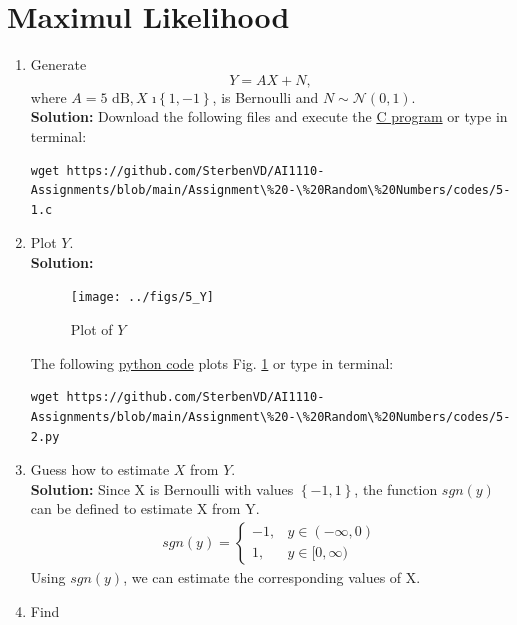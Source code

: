 \documentclass[journal,12pt,twocolumn]{IEEEtran}
\numberwithin{equation}{section}
\renewcommand\thesection{\arabic{section}}
\providecommand{\brak}[1]{\ensuremath{\left(#1\right)}}
\providecommand{\cbrak}[1]{\ensuremath{\left\{#1\right\}}}
\providecommand{\gauss}[2]{\mathcal{N}\ensuremath{\left(#1,#2\right)}}
\providecommand{\gitlink}[2]{{\color{blue}\href{https://github.com/SterbenVD/AI1110-Assignments/blob/main/Assignment\%20-\%20Random\%20Numbers/#1}{#2}}}
\newcommand{\solution}{\noindent \textbf{Solution: }}
\begin{document}
\section{Maximul Likelihood}
\begin{enumerate}[label=\thesection.\arabic*
        ,ref=\thesection.\theenumi]
    \item Generate
          \begin{equation}
              Y = AX+N,
          \end{equation}
          where $A = 5 \text{ dB}, X$ \i $\cbrak{1,-1}$,  is Bernoulli and $N \sim \gauss{0}{1}$. \\
          \solution Download the following files and execute the \gitlink{codes/5-1.c}{C program} or type in terminal:
          \begin{lstlisting}
wget https://github.com/SterbenVD/AI1110-Assignments/blob/main/Assignment\%20-\%20Random\%20Numbers/codes/5-1.c
                    \end{lstlisting}
    \item Plot $Y$. \\
          \solution
          \begin{figure}[H]
              \centering
              \texttt{[image: ../figs/5\_Y]}
              \caption{Plot of $Y$}
              \label{fig:5_Y}
          \end{figure}
          The following \gitlink{codes/5-2.py}{python code} plots Fig. \ref{fig:5_Y} or type in terminal:
          \begin{lstlisting}
wget https://github.com/SterbenVD/AI1110-Assignments/blob/main/Assignment\%20-\%20Random\%20Numbers/codes/5-2.py
            \end{lstlisting}
    \item Guess how to estimate $X$ from $Y$. \\
          \solution Since X is Bernoulli with values $\cbrak{-1,1}$,
          the function $sgn\brak{y}$ can be defined to estimate X from Y.
          \begin{align}
              sgn(y) =
              \begin{cases}
                  -1, & y \in (-\infty,0)
                  \\
                  1,  & y \in [0, \infty)
              \end{cases}
          \end{align}
          Using $sgn\brak{y}$, we can estimate the corresponding values of X.
          \label{ml-ch4_sim}
    \item Find

\end{enumerate}
\end{document}
